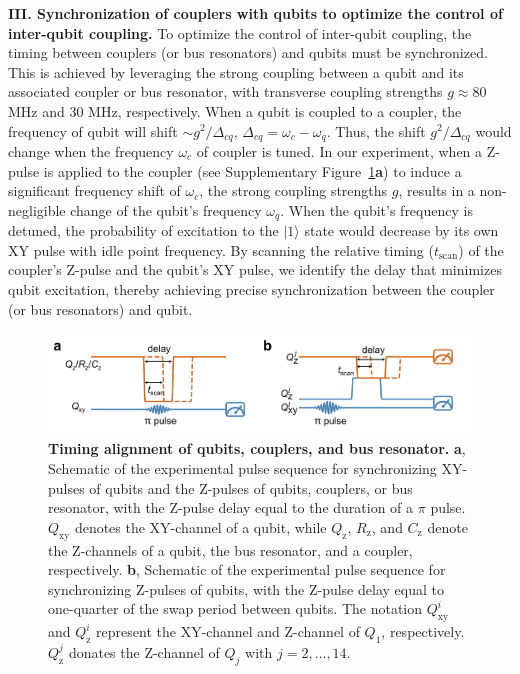 \documentclass[reprint,superscriptaddress,preprintnumbers,longbibliography,
amsmath,amssymb,aps,floatfix,pra,twocolumn, tightenlines %
]{revtex4-2}
\begin{document}
    \textbf{III. Synchronization of couplers with qubits to optimize the control of inter-qubit coupling.} To optimize the control of inter-qubit coupling, the timing between couplers (or bus resonators) and qubits must be synchronized. This is achieved by leveraging the strong coupling between a qubit and its associated coupler or bus resonator, with transverse coupling strengths $g \approx 80$ MHz and $30$ MHz, respectively. When a qubit is coupled to a coupler, the frequency of qubit will shift $\sim g^2/\Delta_{cq}$, $\Delta_{cq} = \omega_c - \omega_q$. Thus, the shift $g^2/\Delta_{cq}$ would change when the frequency $\omega_c$  of coupler is tuned. In our experiment, when a Z-pulse is applied to the coupler (see Supplementary Figure~\ref{timing}\textbf{a}) to induce a significant frequency shift of $\omega_c$, the strong coupling strengths $\textit{g}$, results in a non-negligible change of the qubit’s frequency $\omega_q$. When the qubit’s frequency is detuned, the probability of excitation to the $|1\rangle$ state would decrease by its own XY pulse with idle point frequency. By scanning the relative timing ($t_{\text{scan}}$) of the coupler’s Z-pulse and the qubit’s XY pulse, we identify the delay that minimizes qubit excitation, thereby achieving precise synchronization between the coupler (or bus resonators) and qubit.

	\begin{figure}
		\centering
		\includegraphics[width=1.0\linewidth]{suppFig/FigureSI_timing.pdf}
		\caption{\textbf{Timing alignment of qubits, couplers, and bus resonator.} \textbf{a}, Schematic of the experimental pulse sequence for synchronizing XY-pulses of qubits and the Z-pulses of qubits, couplers, or bus resonator, with the Z-pulse delay equal to the duration of a \(\pi\) pulse. \(Q_\text{xy}\) denotes the XY-channel of a qubit, while \(Q_\text{z}\), \(R_\text{z}\), and \(C_\text{z}\) denote the Z-channels of a qubit, the bus resonator, and a coupler, respectively. \textbf{b}, Schematic of the experimental pulse sequence for synchronizing Z-pulses of qubits, with the Z-pulse delay equal to one-quarter of the swap period between qubits. The notation \(Q^i_\text{xy}\) and \(Q^i_\text{z}\) represent the XY-channel and Z-channel of \(Q_1\), respectively. \(Q^j_\text{z}\) donates the Z-channel of \(Q_j\) with \(j = 2, \ldots, 14\). }
		\label{timing}
	\end{figure}
    
\end{document}
